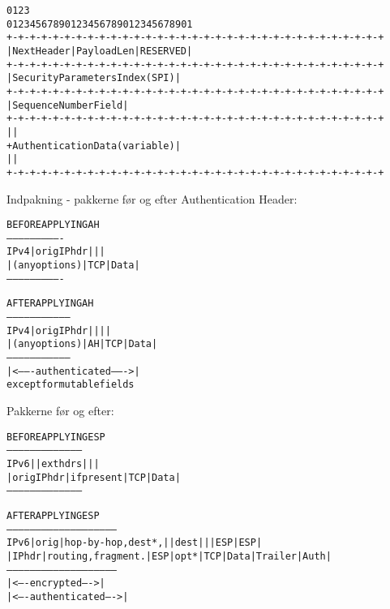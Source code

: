 \documentclass[Screen16to9,17pt]{foils}
\begin{document}
\begin{alltt}
\small
    0                   1                   2                   3
    0 1 2 3 4 5 6 7 8 9 0 1 2 3 4 5 6 7 8 9 0 1 2 3 4 5 6 7 8 9 0 1
   +-+-+-+-+-+-+-+-+-+-+-+-+-+-+-+-+-+-+-+-+-+-+-+-+-+-+-+-+-+-+-+-+
   | Next Header   |  Payload Len  |          RESERVED             |
   +-+-+-+-+-+-+-+-+-+-+-+-+-+-+-+-+-+-+-+-+-+-+-+-+-+-+-+-+-+-+-+-+
   |                 Security Parameters Index (SPI)               |
   +-+-+-+-+-+-+-+-+-+-+-+-+-+-+-+-+-+-+-+-+-+-+-+-+-+-+-+-+-+-+-+-+
   |                    Sequence Number Field                      |
   +-+-+-+-+-+-+-+-+-+-+-+-+-+-+-+-+-+-+-+-+-+-+-+-+-+-+-+-+-+-+-+-+
   |                                                               |
   +                Authentication Data (variable)                 |
   |                                                               |
   +-+-+-+-+-+-+-+-+-+-+-+-+-+-+-+-+-+-+-+-+-+-+-+-+-+-+-+-+-+-+-+-+
\end{alltt}


Indpakning - pakkerne før og efter Authentication Header:
\begin{alltt}
\small
                BEFORE APPLYING AH
            ----------------------------
      IPv4  |orig IP hdr  |     |      |
            |(any options)| TCP | Data |
            ----------------------------

                  AFTER APPLYING AH
            ---------------------------------
      IPv4  |orig IP hdr  |    |     |      |
            |(any options)| AH | TCP | Data |
            ---------------------------------
            |<------- authenticated ------->|
                 except for mutable fields
\end{alltt}


Pakkerne før og efter:
\begin{alltt}
\small
               BEFORE APPLYING ESP
         ---------------------------------------
   IPv6  |             | ext hdrs |     |      |
         | orig IP hdr |if present| TCP | Data |
         ---------------------------------------



               AFTER APPLYING ESP
         ---------------------------------------------------------
   IPv6  | orig |hop-by-hop,dest*,|   |dest|   |    | ESP   | ESP|
         |IP hdr|routing,fragment.|ESP|opt*|TCP|Data|Trailer|Auth|
         ---------------------------------------------------------
                                   |<---- encrypted ---->|
                               |<---- authenticated ---->|
\end{alltt}
\end{document}
